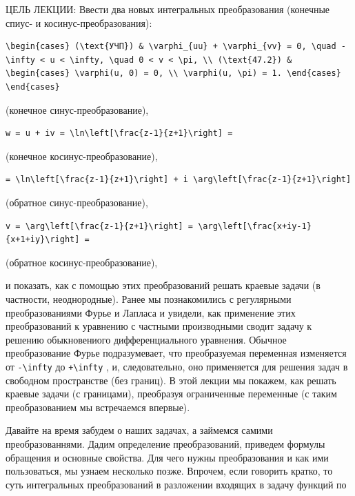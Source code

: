 \documentclass[
  ukrainian,
]{article}
\begin{document}
ЦЕЛЬ ЛЕКЦИИ: Ввести два новых интегральных преобразования (конечные
спиус- и косинус-преобразования):

\begin{verbatim}
\begin{cases} (\text{УЧП}) & \varphi_{uu} + \varphi_{vv} = 0, \quad -\infty < u < \infty, \quad 0 < v < \pi, \\ (\text{47.2}) & \begin{cases} \varphi(u, 0) = 0, \\ \varphi(u, \pi) = 1. \end{cases} \end{cases}
\end{verbatim}

(конечное синус-преобразование),

\begin{verbatim}
w = u + iv = \ln\left[\frac{z-1}{z+1}\right] =
\end{verbatim}

(конечное косинус-преобразование),

\begin{verbatim}
= \ln\left[\frac{z-1}{z+1}\right] + i \arg\left[\frac{z-1}{z+1}\right]
\end{verbatim}

(обратное синус-преобразование),

\begin{verbatim}
v = \arg\left[\frac{z-1}{z+1}\right] = \arg\left[\frac{x+iy-1}{x+1+iy}\right] =
\end{verbatim}

(обратное косинус-преобразование),

и показать, как с помощью этих преобразований решать краевые задачи (в
частности, неоднородные). Ранее мы познакомились с регулярными
преобразованиями Фурье и Лапласа и увидели, как применение этих
преобразований к уравнению с частными производными сводит задачу к
решению обыкновениого дифференциального уравнения. Обычное
преобразование Фурье подразумевает, что преобразуемая переменная
изменяется от \texttt{-\textbackslash{}infty} до
\texttt{+\textbackslash{}infty} , и, следовательно, оно применяется для
решения задач в свободном пространстве (без границ). В этой лекции мы
покажем, как решать краевые задачи (с границами), преобразуя
ограниченные переменные (с таким преобразованием мы встречаемся
впервые).

Давайте на время забудем о наших задачах, а займемся самими
преобразованнями. Дадим определение преобразований, приведем формулы
обращения и основные свойства. Для чего нужны преобразования и как ими
пользоваться, мы узнаем несколько позже. Впрочем, если говорить кратко,
то суть интегральных преобразований в разложении входящих в задачу
функций по
\end{document}
